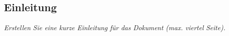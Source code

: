 \subsection{Einleitung}

\textit{
    Erstellen Sie eine kurze Einleitung für das Dokument (max. viertel Seite).
}

